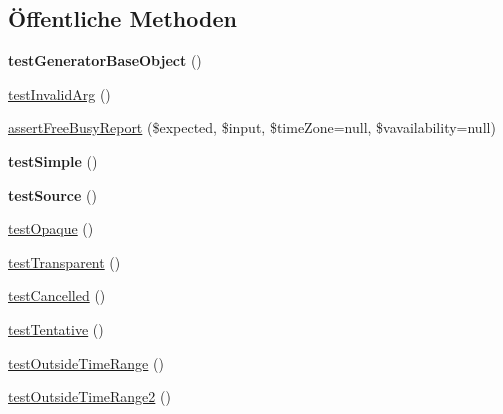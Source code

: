 \subsection*{Öffentliche Methoden}
\begin{DoxyCompactItemize}
\item 
\mbox{\label{class_sabre_1_1_v_object_1_1_free_busy_generator_test_a5390892e9c9fea10fd45710be59b1849}} 
{\bfseries test\+Generator\+Base\+Object} ()
\item 
\mbox{\hyperlink{class_sabre_1_1_v_object_1_1_free_busy_generator_test_af24aa002f4a13f217e334f71bcfceba3}{test\+Invalid\+Arg}} ()
\item 
\mbox{\hyperlink{class_sabre_1_1_v_object_1_1_free_busy_generator_test_a42f5812a3fa2e68c564dea8b4667e73b}{assert\+Free\+Busy\+Report}} (\$expected, \$input, \$time\+Zone=null, \$vavailability=null)
\item 
\mbox{\label{class_sabre_1_1_v_object_1_1_free_busy_generator_test_a96be9fb50ee76d5f098ab2d9e125d7ed}} 
{\bfseries test\+Simple} ()
\item 
\mbox{\label{class_sabre_1_1_v_object_1_1_free_busy_generator_test_a96cb41b6b53fd7beb9fcb59f772effff}} 
{\bfseries test\+Source} ()
\item 
\mbox{\hyperlink{class_sabre_1_1_v_object_1_1_free_busy_generator_test_a126c68f611af6c7c60d0395248e36b30}{test\+Opaque}} ()
\item 
\mbox{\hyperlink{class_sabre_1_1_v_object_1_1_free_busy_generator_test_aadc17b1c4726bc368bdf885716cc660c}{test\+Transparent}} ()
\item 
\mbox{\hyperlink{class_sabre_1_1_v_object_1_1_free_busy_generator_test_a41a0e28dad71639bef363b771979d1b4}{test\+Cancelled}} ()
\item 
\mbox{\hyperlink{class_sabre_1_1_v_object_1_1_free_busy_generator_test_a465582b8dccc89abcb2c0e51c8b23190}{test\+Tentative}} ()
\item 
\mbox{\hyperlink{class_sabre_1_1_v_object_1_1_free_busy_generator_test_a66ebab43494d45e79e4636d36057cca2}{test\+Outside\+Time\+Range}} ()
\item 
\mbox{\hyperlink{class_sabre_1_1_v_object_1_1_free_busy_generator_test_a52df5d919fe10184a5f5e270d01ed711}{test\+Outside\+Time\+Range2}} ()

\end{DoxyCompactItemize}
